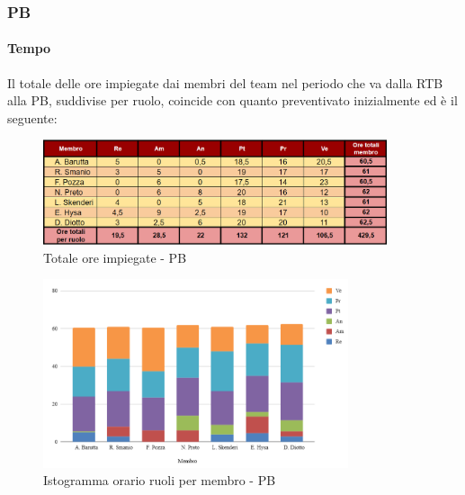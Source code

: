 \vspace{0.3cm}

\subsubsection{PB}

\paragraph{Tempo}
Il totale delle ore impiegate dai membri del team nel periodo che va dalla RTB alla PB, suddivise per ruolo, coincide con quanto preventivato inizialmente ed è il seguente:

\begin{figure}[H]
    \centering
    \includegraphics[width=0.9\textwidth]{../Images/riepilogoPBOreMembro.png}
    \caption{Totale ore impiegate - PB}
    \label{fig:Tot_orePB}
\end{figure}

\vspace{0.6cm}

\begin{figure}[H]
    \centering
    \includegraphics[width=0.8\textwidth]{../Images/graficoOrarioRuoloPB.png}
    \caption{Istogramma orario ruoli per membro - PB}
    \label{fig:GraficoOrePB}
\end{figure}


